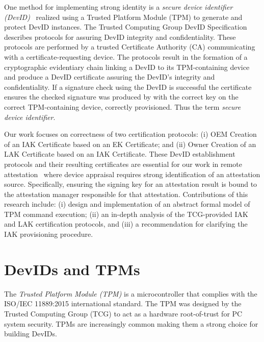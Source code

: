 \documentclass[runningheads]{llncs}
\begin{document}
One method for implementing strong identity is a \emph{secure device
  identifier (DevID)}~\citep{DevIDSpec-IEEE} realized using a Trusted
Platform Module (TPM) to generate and protect DevID instances.  The
Trusted Computing Group DevID Specification~\citep{DevIDSpec-TCG}
describes protocols for assuring DevID integrity and
confidentiality. These protocols are performed by a trusted
Certificate Authority (CA) communicating with a certificate-requesting
device.  The protocols result in the formation of a cryptographic
evidentiary chain linking a DevID to its TPM-containing device and
produce a DevID certificate assuring the DevID's integrity and
confidentiality. If a signature check using the DevID is successful
the certificate ensures the checked signature was produced by with the
correct key on the correct TPM-containing device, correctly
provisioned.  Thus the term \emph{secure device identifier}.


Our work focuses on correctness of two certification protocols:
(i) OEM Creation of an IAK Certificate based on an EK Certificate; and
(ii) Owner Creation of an LAK Certificate based on an IAK
Certificate. These DevID establishment protocols and their resulting
certificates are essential for our work in remote
attestation~\citep{Coker::Principles-of-R,petz2022innovations} where
device appraisal requires strong identification of an attestation
source. Specifically, ensuring the signing key for an attestation
result is bound to the attestation manager responsible for that
attestation.  Contributions of this research include: (i) design and
implementation of an abstract formal model of TPM command execution;
(ii) an in-depth analysis of the TCG-provided IAK and LAK
certification protocols, and (iii) a recommendation for clarifying the
IAK provisioning procedure.

\section{DevIDs and TPMs}
The \emph{Trusted Platform Module (TPM)} is a microcontroller that complies
with the ISO/IEC 11889:2015 international standard.  The TPM was
designed by the Trusted Computing Group (TCG) to act as a hardware
root-of-trust for PC system security.  TPMs are increasingly common
making them a strong choice for building DevIDs.
\end{document}
